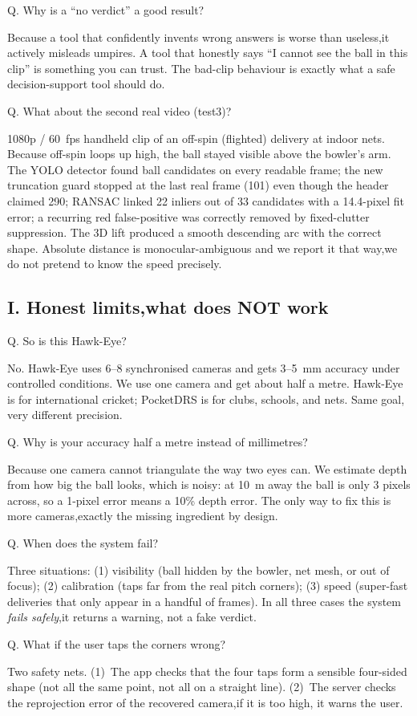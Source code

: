 \documentclass[11pt,a4paper]{article}
\newcommand{\qa}[2]{%
  \par\vspace{8pt}%
  \noindent
  \colorbox{NavyTint}{%
    \begin{minipage}{\dimexpr\textwidth-2\fboxsep\relax}%
      \color{white}\bfseries\strut Q. #1%
    \end{minipage}%
  }\par\nobreak
  \noindent
  \colorbox{MutedBg}{%
    \begin{minipage}{\dimexpr\textwidth-2\fboxsep\relax}%
      \color{black}\setlength{\parskip}{4pt}\strut #2\strut%
    \end{minipage}%
  }%
  \par\vspace{6pt}%
}
\begin{document}
\qa{Why is a ``no verdict'' a good result?}{%
Because a tool that confidently invents wrong answers is worse than useless,it actively misleads umpires. A tool that honestly says ``I cannot see the ball in this clip'' is something you can trust. The bad-clip behaviour is exactly what a safe decision-support tool should do.}

\qa{What about the second real video (test3)?}{%
1080p / 60~fps handheld clip of an off-spin (flighted) delivery at indoor nets. Because off-spin loops up high, the ball stayed visible above the bowler's arm. The YOLO detector found ball candidates on every readable frame; the new truncation guard stopped at the last real frame (101) even though the header claimed 290; RANSAC linked 22 inliers out of 33 candidates with a 14.4-pixel fit error; a recurring red false-positive was correctly removed by fixed-clutter suppression. The 3D lift produced a smooth descending arc with the correct shape. Absolute distance is monocular-ambiguous and we report it that way,we do not pretend to know the speed precisely.}

\subsection{I. Honest limits,what does NOT work}

\qa{So is this Hawk-Eye?}{%
No. Hawk-Eye uses 6--8 synchronised cameras and gets 3--5~mm accuracy under controlled conditions. We use one camera and get about half a metre. Hawk-Eye is for international cricket; PocketDRS is for clubs, schools, and nets. Same goal, very different precision.}

\qa{Why is your accuracy half a metre instead of millimetres?}{%
Because one camera cannot triangulate the way two eyes can. We estimate depth from how big the ball looks, which is noisy: at 10~m away the ball is only 3 pixels across, so a 1-pixel error means a 10\% depth error. The only way to fix this is more cameras,exactly the missing ingredient by design.}

\qa{When does the system fail?}{%
Three situations: (1) visibility (ball hidden by the bowler, net mesh, or out of focus); (2) calibration (taps far from the real pitch corners); (3) speed (super-fast deliveries that only appear in a handful of frames). In all three cases the system \emph{fails safely},it returns a warning, not a fake verdict.}

\qa{What if the user taps the corners wrong?}{%
Two safety nets. (1)~The app checks that the four taps form a sensible four-sided shape (not all the same point, not all on a straight line). (2)~The server checks the reprojection error of the recovered camera,if it is too high, it warns the user.}
\end{document}
